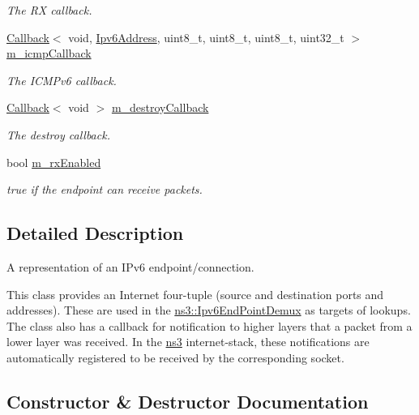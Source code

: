 \begin{DoxyCompactItemize}
\begin{DoxyCompactList}\small\item\em The RX callback. \end{DoxyCompactList}\item 
\hyperlink{classns3_1_1Callback}{Callback}$<$ void, \hyperlink{classns3_1_1Ipv6Address}{Ipv6\+Address}, uint8\+\_\+t, uint8\+\_\+t, uint8\+\_\+t, uint32\+\_\+t $>$ \hyperlink{classns3_1_1Ipv6EndPoint_a2a8245006d57149897aa7ded7fd65408}{m\+\_\+icmp\+Callback}
\begin{DoxyCompactList}\small\item\em The I\+C\+M\+Pv6 callback. \end{DoxyCompactList}\item 
\hyperlink{classns3_1_1Callback}{Callback}$<$ void $>$ \hyperlink{classns3_1_1Ipv6EndPoint_a77be85cf92f9ad80c0578f4a9dd1b379}{m\+\_\+destroy\+Callback}
\begin{DoxyCompactList}\small\item\em The destroy callback. \end{DoxyCompactList}\item 
bool \hyperlink{classns3_1_1Ipv6EndPoint_a63d3381b11d213f97bf47c935eeb4cd7}{m\+\_\+rx\+Enabled}
\begin{DoxyCompactList}\small\item\em true if the endpoint can receive packets. \end{DoxyCompactList}\end{DoxyCompactItemize}


\subsection{Detailed Description}
A representation of an I\+Pv6 endpoint/connection. 

This class provides an Internet four-\/tuple (source and destination ports and addresses). These are used in the \hyperlink{classns3_1_1Ipv6EndPointDemux}{ns3\+::\+Ipv6\+End\+Point\+Demux} as targets of lookups. The class also has a callback for notification to higher layers that a packet from a lower layer was received. In the \hyperlink{namespacens3}{ns3} internet-\/stack, these notifications are automatically registered to be received by the corresponding socket. 

\subsection{Constructor \& Destructor Documentation}
